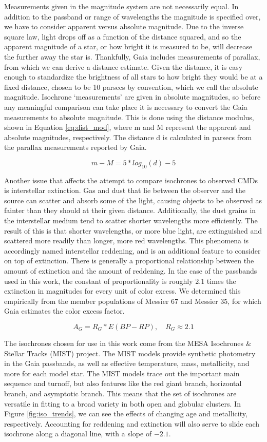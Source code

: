 \documentclass[onecolumn,table,xcdraw,super]{aastex631}
\newcommand{\beq}{\begin{equation}}
\newcommand{\eeq}{\end{equation}}
\begin{document}
Measurements given in the magnitude system are not necessarily equal. In addition to the passband or range of wavelengths the magnitude is specified over, we have to consider apparent versus absolute magnitude. Due to the inverse square law, light drops off as a function of the distance squared, and so the apparent magnitude of a star, or how bright it is measured to be, will decrease the further away the star is. Thankfully, Gaia includes measurements of parallax, from which we can derive a distance estimate. Given the distance, it is easy enough to standardize the brightness of all stars to how bright they would be at a fixed distance, chosen to be 10 parsecs by convention, which we call the absolute magnitude. Isochrone `measurements' are given in absolute magnitudes, so before any meaningful comparison can take place it is necessary to convert the Gaia measurements to absolute magnitude. This is done using the distance modulus, shown in Equation \ref{eq:dist_mod}, where m and M represent the apparent and absolute magnitudes, respectively. The distance d is calculated in parsecs from the parallax measurements reported by Gaia.

\beq
\label{eq:dist_mod}
m - M  = 5*log_{10}\left(d\right) - 5
\eeq

Another issue that affects the attempt to compare isochrones to observed CMDs is interstellar extinction. Gas and dust that lie between the observer and the source can scatter and absorb some of the light, causing objects to be observed as fainter than they should at their given distance. Additionally, the dust grains in the interstellar medium tend to scatter shorter wavelengths more efficiently. The result of this is that shorter wavelengths, or more blue light, are extinguished and scattered more readily than longer, more red wavelengths. This phenomena is accordingly named interstellar reddening, and is an additional feature to consider on top of extinction. There is generally a proportional relationship between the amount of extinction and the amount of reddening. In the case of the passbands used in this work, the constant of proportionality is roughly 2.1 times the extinction in magnitudes for every unit of color excess. We determined this empirically from the member populations of Messier 67 and Messier 35, for which Gaia estimates the color excess factor.

\beq
\label{eq:extinction}
A_G = R_G * E\left(BP-RP\right), \quad R_G \approx 2.1
\eeq

The isochrones chosen for use in this work come from the MESA Isochrones \& Stellar Tracks (MIST) project. The MIST models provide synthetic photometry in the Gaia passbands, as well as effective temperature, mass, metallicity, and more for each model star. The MIST models trace out the important main sequence and turnoff, but also features like the red giant branch, horizontal branch, and asymptotic branch. This means that the set of isochrones are versatile in fitting to a broad variety in both open and globular clusters. In Figure \ref{fig:iso_trends}, we can see the effects of changing age and metallicity, respectively. Accounting for reddening and extinction will also serve to slide each isochrone along a diagonal line, with a slope of $-2.1$.
\end{document}
